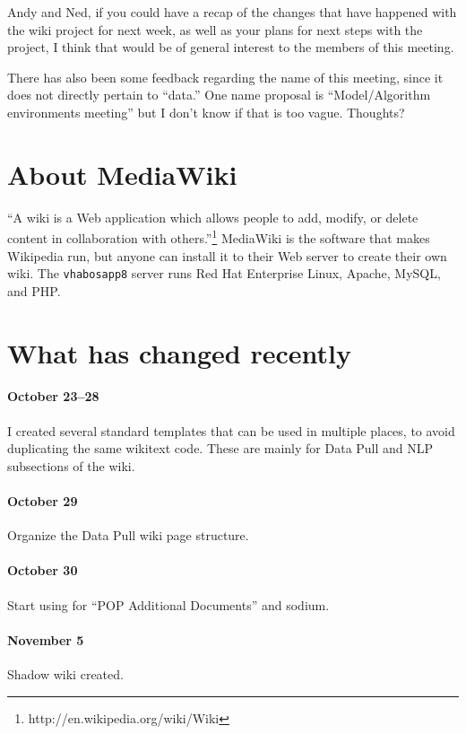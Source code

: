 \documentclass{tufte-handout}
\begin{document}
Andy and Ned, if you could have a recap of the changes that have
happened with the wiki project for next week, as well as your plans
for next steps with the project, I think that would be of general
interest to the members of this meeting.
 
There has also been some feedback regarding the name of this meeting,
since it does not directly pertain to ``data.'' One name proposal is
``Model/Algorithm environments meeting'' but I don't know if that is
too vague. Thoughts?

\section{About MediaWiki}

``A wiki is a Web application which allows people to add, modify, or
delete content in collaboration with
others.''\footnote{http://en.wikipedia.org/wiki/Wiki} MediaWiki is the
software that makes Wikipedia run, but anyone can install it to their
Web server to create their own wiki. The \texttt{vhabosapp8} server
runs Red Hat Enterprise Linux, Apache, MySQL, and PHP.

\section{What has changed recently}

\paragraph{October 23--28} I created several standard templates that
can be used in multiple places, to avoid duplicating the same wikitext
code. These are mainly for Data Pull and NLP subsections of the wiki. 

\paragraph{October 29} Organize the Data Pull wiki page structure. 

\paragraph{October 30} Start using for ``POP Additional Documents''
and sodium.

\paragraph{November 5} Shadow wiki created.
\end{document}
